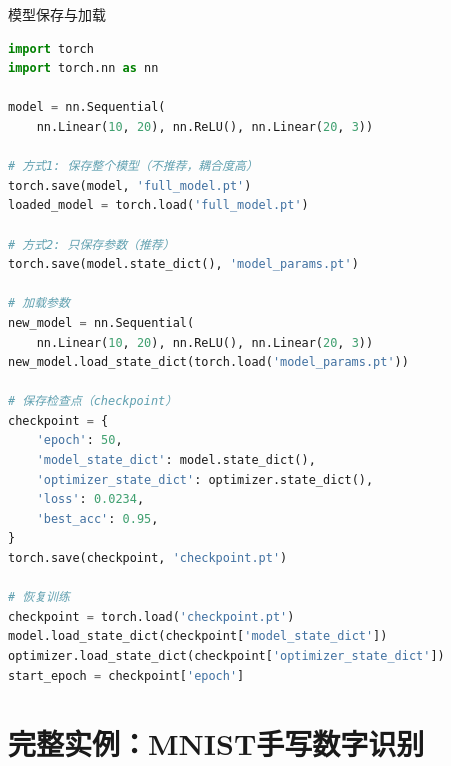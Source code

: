 \begin{mycode}{模型保存与加载}
\begin{lstlisting}[language=Python]
import torch
import torch.nn as nn

model = nn.Sequential(
    nn.Linear(10, 20), nn.ReLU(), nn.Linear(20, 3))

# 方式1: 保存整个模型（不推荐，耦合度高）
torch.save(model, 'full_model.pt')
loaded_model = torch.load('full_model.pt')

# 方式2: 只保存参数（推荐）
torch.save(model.state_dict(), 'model_params.pt')

# 加载参数
new_model = nn.Sequential(
    nn.Linear(10, 20), nn.ReLU(), nn.Linear(20, 3))
new_model.load_state_dict(torch.load('model_params.pt'))

# 保存检查点（checkpoint）
checkpoint = {
    'epoch': 50,
    'model_state_dict': model.state_dict(),
    'optimizer_state_dict': optimizer.state_dict(),
    'loss': 0.0234,
    'best_acc': 0.95,
}
torch.save(checkpoint, 'checkpoint.pt')

# 恢复训练
checkpoint = torch.load('checkpoint.pt')
model.load_state_dict(checkpoint['model_state_dict'])
optimizer.load_state_dict(checkpoint['optimizer_state_dict'])
start_epoch = checkpoint['epoch']
\end{lstlisting}
\end{mycode}

\section{完整实例：MNIST手写数字识别}

